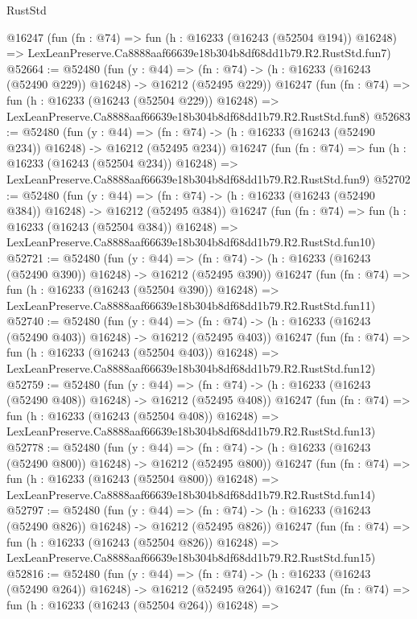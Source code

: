 \begin{lexlean}{RustStd}
\begin{coremodule}
    @16247
    (fun (fn : @74) =>
    fun (h : @16233 (@16243 (@52504 @194)) @16248) =>
    LexLeanPreserve.Ca8888aaf66639e18b304b8df68dd1b79.R2.RustStd.fun7)
@52664 := @52480
    (fun (y : @44) =>
    (fn : @74) -> (h : @16233 (@16243 (@52490 @229)) @16248) -> @16212 (@52495 @229))
    @16247
    (fun (fn : @74) =>
    fun (h : @16233 (@16243 (@52504 @229)) @16248) =>
    LexLeanPreserve.Ca8888aaf66639e18b304b8df68dd1b79.R2.RustStd.fun8)
@52683 := @52480
    (fun (y : @44) =>
    (fn : @74) -> (h : @16233 (@16243 (@52490 @234)) @16248) -> @16212 (@52495 @234))
    @16247
    (fun (fn : @74) =>
    fun (h : @16233 (@16243 (@52504 @234)) @16248) =>
    LexLeanPreserve.Ca8888aaf66639e18b304b8df68dd1b79.R2.RustStd.fun9)
@52702 := @52480
    (fun (y : @44) =>
    (fn : @74) -> (h : @16233 (@16243 (@52490 @384)) @16248) -> @16212 (@52495 @384))
    @16247
    (fun (fn : @74) =>
    fun (h : @16233 (@16243 (@52504 @384)) @16248) =>
    LexLeanPreserve.Ca8888aaf66639e18b304b8df68dd1b79.R2.RustStd.fun10)
@52721 := @52480
    (fun (y : @44) =>
    (fn : @74) -> (h : @16233 (@16243 (@52490 @390)) @16248) -> @16212 (@52495 @390))
    @16247
    (fun (fn : @74) =>
    fun (h : @16233 (@16243 (@52504 @390)) @16248) =>
    LexLeanPreserve.Ca8888aaf66639e18b304b8df68dd1b79.R2.RustStd.fun11)
@52740 := @52480
    (fun (y : @44) =>
    (fn : @74) -> (h : @16233 (@16243 (@52490 @403)) @16248) -> @16212 (@52495 @403))
    @16247
    (fun (fn : @74) =>
    fun (h : @16233 (@16243 (@52504 @403)) @16248) =>
    LexLeanPreserve.Ca8888aaf66639e18b304b8df68dd1b79.R2.RustStd.fun12)
@52759 := @52480
    (fun (y : @44) =>
    (fn : @74) -> (h : @16233 (@16243 (@52490 @408)) @16248) -> @16212 (@52495 @408))
    @16247
    (fun (fn : @74) =>
    fun (h : @16233 (@16243 (@52504 @408)) @16248) =>
    LexLeanPreserve.Ca8888aaf66639e18b304b8df68dd1b79.R2.RustStd.fun13)
@52778 := @52480
    (fun (y : @44) =>
    (fn : @74) -> (h : @16233 (@16243 (@52490 @800)) @16248) -> @16212 (@52495 @800))
    @16247
    (fun (fn : @74) =>
    fun (h : @16233 (@16243 (@52504 @800)) @16248) =>
    LexLeanPreserve.Ca8888aaf66639e18b304b8df68dd1b79.R2.RustStd.fun14)
@52797 := @52480
    (fun (y : @44) =>
    (fn : @74) -> (h : @16233 (@16243 (@52490 @826)) @16248) -> @16212 (@52495 @826))
    @16247
    (fun (fn : @74) =>
    fun (h : @16233 (@16243 (@52504 @826)) @16248) =>
    LexLeanPreserve.Ca8888aaf66639e18b304b8df68dd1b79.R2.RustStd.fun15)
@52816 := @52480
    (fun (y : @44) =>
    (fn : @74) -> (h : @16233 (@16243 (@52490 @264)) @16248) -> @16212 (@52495 @264))
    @16247
    (fun (fn : @74) =>
    fun (h : @16233 (@16243 (@52504 @264)) @16248) =>

\end{coremodule}
\end{lexlean}
